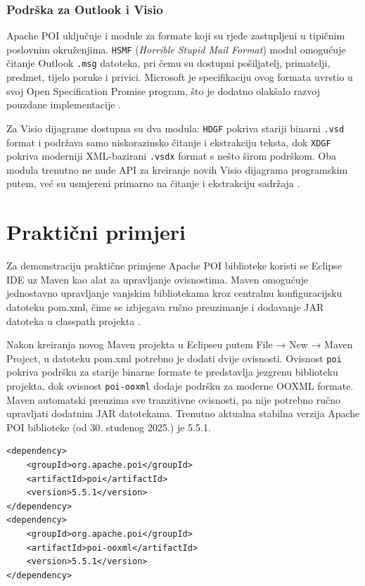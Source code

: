 \documentclass[]{foi}
\begin{document}
\subsection{Podrška za Outlook i Visio}

Apache POI uključuje i module za formate koji su rjeđe zastupljeni u tipičnim poslovnim okruženjima. \texttt{HSMF} (\textit{Horrible Stupid Mail Format}) modul omogućuje čitanje Outlook \texttt{.msg} datoteka, pri čemu su dostupni pošiljatelj, primatelji, predmet, tijelo poruke i privici. Microsoft je specifikaciju ovog formata uvrstio u svoj Open Specification Promise program, što je dodatno olakšalo razvoj pouzdane implementacije \cite{apacheApachePOIComponents}. 

Za Visio dijagrame dostupna su dva modula: \texttt{HDGF} pokriva stariji binarni \texttt{.vsd} format i podržava samo niskorazinsko čitanje i ekstrakciju teksta, dok \texttt{XDGF} pokriva moderniji XML-bazirani \texttt{.vsdx} format s nešto širom podrškom. Oba modula trenutno ne nude API za kreiranje novih Visio dijagrama programskim putem, već su usmjereni primarno na čitanje i ekstrakciju sadržaja \cite{apacheApachePOIComponents}.

\chapter{Praktični primjeri}

Za demonstraciju praktične primjene Apache POI biblioteke koristi se Eclipse IDE uz Maven kao alat za upravljanje ovisnostima. Maven omogućuje jednostavno upravljanje vanjskim bibliotekama kroz centralnu konfiguracijsku datoteku pom.xml, čime se izbjegava ručno preuzimanje i dodavanje JAR datoteka u classpath projekta \cite{apacheApachePOIdownload}.

Nakon kreiranja novog Maven projekta u Eclipseu putem File → New → Maven Project, u datoteku pom.xml potrebno je dodati dvije ovisnosti. Ovisnost \texttt{poi} pokriva podršku za starije binarne formate te predstavlja jezgrenu biblioteku projekta, dok ovisnost \texttt{poi-ooxml} dodaje podršku za moderne OOXML formate. Maven automatski preuzima sve tranzitivne ovisnosti, pa nije potrebno ručno upravljati dodatnim JAR datotekama. Trenutno aktualna stabilna verzija Apache POI biblioteke (od 30. studenog 2025.) je 5.5.1. \cite{apacheApachePOIdownload}

\begin{lstlisting}[style=xml, caption={Ovisnosti u datoteci pom.xml}]
<dependency>
    <groupId>org.apache.poi</groupId>
    <artifactId>poi</artifactId>
    <version>5.5.1</version>
</dependency>
<dependency>
    <groupId>org.apache.poi</groupId>
    <artifactId>poi-ooxml</artifactId>
    <version>5.5.1</version>
</dependency>
\end{lstlisting}
\end{document}

